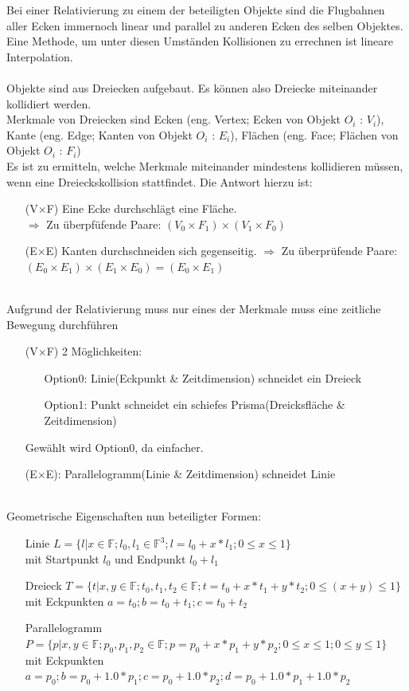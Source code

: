 Bei einer Relativierung zu einem der beteiligten Objekte sind die Flugbahnen aller Ecken immernoch linear und parallel zu anderen Ecken des selben Objektes.\\
Eine Methode, um unter diesen Umständen Kollisionen zu errechnen ist lineare Interpolation.\\
\\
Objekte sind aus Dreiecken aufgebaut. Es können also Dreiecke miteinander kollidiert werden.\\
		Merkmale von Dreiecken sind Ecken (eng. Vertex; Ecken von Objekt $O_i$ : $V_i$), Kante (eng. Edge; Kanten von Objekt $O_i$ : $E_i$), Flächen (eng. Face; Flächen von Objekt $O_i$ : $F_i$)\\
		Es ist zu ermitteln, welche Merkmale miteinander mindestens kollidieren müssen, wenn eine Dreieckskollision stattfindet. Die Antwort hierzu ist:
		\begin{itemize}
			\item [(V$\times$F)] Eine Ecke durchschlägt eine Fläche.\\
				$\Rightarrow$ Zu überpfüfende Paare: $(V_0\times F_1)\times (V_1\times F_0)$
			\item [(E$\times$E)] Kanten durchschneiden sich gegenseitig.
				$\Rightarrow$ Zu überprüfende Paare: $(E_0\times E_1)\times (E_1\times E_0) = (E_0\times E_1)$
		\end{itemize}
\ \\
		Aufgrund der Relativierung muss nur eines der Merkmale muss eine zeitliche Bewegung durchführen
		\begin{itemize}
			\item [(V$\times$F)] 2 Möglichkeiten:
				\begin{itemize}
					\item[Option0:] Linie(Eckpunkt \& Zeitdimension) schneidet ein Dreieck
					\item[Option1:] Punkt schneidet ein schiefes Prisma(Dreicksfläche \& Zeitdimension)
				\end{itemize}
				Gewählt wird Option0, da einfacher.
			\item [(E$\times$E):]  Parallelogramm(Linie \& Zeitdimension) schneidet Linie
		\end{itemize}
\ \\
		Geometrische Eigenschaften nun beteiligter Formen:
		\begin{itemize}
			\item [Linie] $L = \{l | x\in\mathbb{F} ; l_0, l_1 \in \mathbb{F}^3 ; l = l_0 + x * l_1; 0\le x\le 1 \}$ \\
			mit Startpunkt $l_0$ und Endpunkt $l_0 + l_1$
		\item [Dreieck] $T = \{t | x,y \in\mathbb{F}; t_0, t_1, t_2 \in \mathbb{F}; t = t_0 + x*t_1 + y*t_2; 0\le (x+y) \le 1\}$\\
			mit Eckpunkten $a = t_0 ; b = t_0 + t_1 ; c = t_0 + t_2$ 
			\item [Parallelogramm] $P = \{p | x,y \in\mathbb{F}; p_0, p_1, p_2 \in \mathbb{F}; p = p_0 + x*p_1 + y*p_2; 0\le x\le 1; 0\le y\le 1\}$\\
			mit Eckpunkten $a = p_0 ; b = p_0 + 1.0*p_1 ; c = p_0 + 1.0*p_2; d = p_0 + 1.0*p_1 + 1.0*p_2$ 
		\end{itemize}
